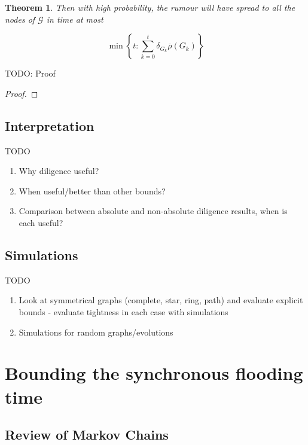 \documentclass[a4paper,11pt]{article}
\newtheorem{theorem}{Theorem}[section]
\theoremstyle{definition}
\newcommand*\comp[1]{\overline{#1}}
\begin{document}
\begin{theorem}
	\ModelIntro Then with high probability, the rumour will have spread to all the nodes of $\mathcal{G}$ in time at most 

	$$ 
		\min \left\{ t : \sum_{k=0}^t \delta_{G_k} \comp{\rho}(G_k) \right\}
	$$

\end{theorem}

TODO: Proof 

\begin{proof}
	
\end{proof}

\subsection{Interpretation}

TODO

\begin{enumerate}
	\item Why diligence useful?
	\item When useful/better than other bounds?
	\item Comparison between absolute and non-absolute  diligence results, when is each useful?
\end{enumerate}

\subsection{Simulations}

TODO 

\begin{enumerate}
	\item Look at symmetrical graphs (complete, star, ring, path) and evaluate explicit bounds - evaluate tightness in each case with simulations
	\item Simulations for random graphs/evolutions
\end{enumerate}

\section{Bounding the synchronous flooding time}

\subsection{Review of Markov Chains}
\end{document}
